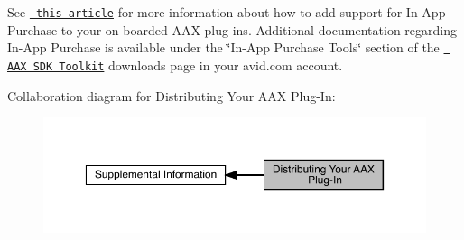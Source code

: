  See \href{https://dev.avid.com/MP_DeveloperForumAnnouncement?AnnouncementId=aBe3100000002bMCAQ}{\texttt{ this article}} for more information about how to add support for In-\/\+App Purchase to your on-\/boarded A\+AX plug-\/ins. Additional documentation regarding In-\/\+App Purchase is available under the \char`\"{}\+In-\/\+App Purchase Tools\char`\"{} section of the \href{https://my.avid.com/products/cppsdk}{\texttt{ A\+AX S\+DK Toolkit}} downloads page in your avid.\+com account.

 Collaboration diagram for Distributing Your A\+AX Plug-\/\+In\+:
\nopagebreak
\begin{figure}[H]
\begin{center}
\leavevmode
\includegraphics[width=350pt]{a00843}
\end{center}
\end{figure}
